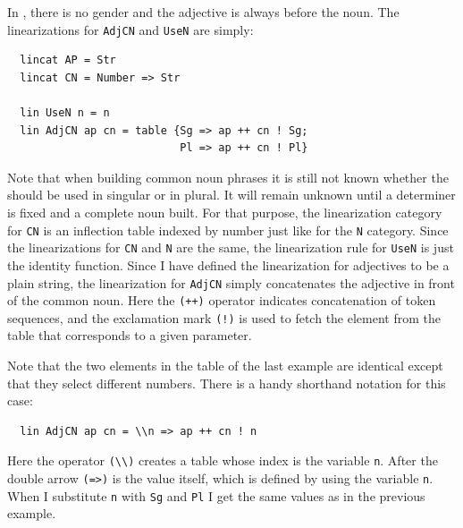 \documentclass[output=paper]{langsci/langscibook}
\begin{document}
In , there is no gender and the adjective is always before the noun. The linearizations for \verb=AdjCN= and \verb=UseN= are simply:
\begin{verbatim}
  lincat AP = Str
  lincat CN = Number => Str

  lin UseN n = n
  lin AdjCN ap cn = table {Sg => ap ++ cn ! Sg;
                           Pl => ap ++ cn ! Pl}
\end{verbatim}
Note that when building common noun phrases it is still not known whether 
the  should be used in singular or in plural. It will remain unknown
until a determiner is fixed and a complete noun  built. 
For that purpose, the linearization category for \verb=CN= is 
an inflection table indexed by number just like for the 
\verb=N= category. Since the linearizations for 
\verb=CN= and \verb=N= are the same, the linearization rule for 
\verb=UseN= is just the identity function. Since I have defined 
the linearization for adjectives to be a plain string, 
the linearization for \verb=AdjCN= simply concatenates 
the adjective  in front of the common noun. Here the \verb=(++)=
operator indicates concatenation of token sequences, and 
the exclamation mark \verb=(!)= is used to fetch the element 
from the table that corresponds to a given parameter.

Note that the two elements in the table of the last example are identical
except that they select different numbers. There is a handy shorthand
notation for this case:
\begin{verbatim}
  lin AdjCN ap cn = \\n => ap ++ cn ! n
\end{verbatim}
Here the operator \verb=(\\)= creates a table whose index is the variable
\verb=n=. After the double arrow \verb/(=>)/ is the value itself, 
which is defined by using the variable \verb=n=. When I
substitute \verb=n= with \verb=Sg= and \verb=Pl= I get the same values
as in the previous example.
\end{document}
